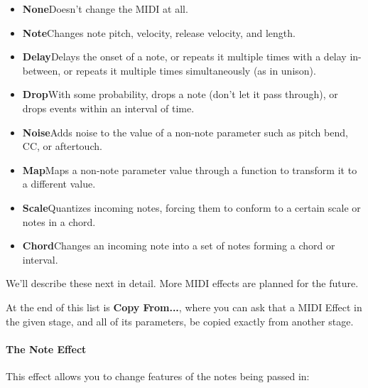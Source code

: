 \documentclass[twoside,10pt]{article}
\begin{document}
\begin{itemize}
\item {\bf None}\qquad Doesn't change the MIDI at all.
\item {\bf Note}\qquad Changes note pitch, velocity, release velocity, and length.
\item {\bf Delay}\qquad Delays the onset of a note, or repeats it multiple times with a delay in-between, or repeats it multiple times simultaneously (as in unison).
\item {\bf Drop}\qquad With some probability, drops a note (don't let it pass through), or drops events within an interval of time.
\item {\bf Noise}\qquad Adds noise to the value of a non-note parameter such as pitch bend, CC, or aftertouch.
\item {\bf Map}\qquad Maps a non-note parameter value through a function to transform it to a different value.
\item {\bf Scale}\qquad Quantizes incoming notes, forcing them to conform to a certain scale or notes in a chord.
\item {\bf Chord}\qquad Changes an incoming note into a set of notes forming a chord or interval.
\end{itemize}

We'll describe these next in detail.  More MIDI effects are planned for the future.

At the end of this list is {\bf Copy From...}, where you can ask that a MIDI Effect in the given stage, and all of its parameters, be copied exactly from another stage.

\paragraph{The Note Effect}

This effect allows you to change features of the notes being passed in:
\end{document}
